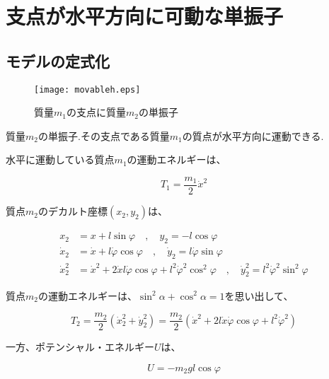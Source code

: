 \chapter{支点が水平方向に可動な単振子}

\section{モデルの定式化}

\begin{figure}[htbp]
  \begin{minipage}[b]{0.45\linewidth}
    \centering
    \texttt{[image: movableh.eps]}
    \caption{質量$m_1$の支点に質量$m_2$の単振子}
  \end{minipage}
\end{figure}

質量$m_2$の単振子.その支点である質量$m_1$の質点が水平方向に運動できる.

水平に運動している質点$m_1$の運動エネルギーは、

\[T_1 = \displaystyle\frac{m_1}{2}\dot{x}^2\]

質点$m_2$のデカルト座標$(x_2,y_2)$は、

\begin{align*}
   x_2 &= x + l\sin\varphi \quad,\quad y_2 = -l\cos\varphi\\
   \dot{x}_2 &= \dot{x} + l\dot{\varphi}\cos\varphi \quad,\quad \dot{y}_2 = l\dot{\varphi}\sin\varphi\\
   \dot{x}_2^2 &= \dot{x}^2 + 2\dot{x}l\dot{\varphi}\cos\varphi + l^2\dot{\varphi}^2\cos^2\varphi \quad,\quad \dot{y}_2^2 = l^2\dot{\varphi}^2\sin^2\varphi
\end{align*}

質点$m_2$の運動エネルギーは、$\sin^2\alpha+\cos^2\alpha=1$を思い出して、

\[T_2 = \displaystyle\frac{m_2}{2}\left(\dot{x}_2^2+\dot{y}_2^2\right) = \displaystyle\frac{m_2}{2}\left(\dot{x}^2 + 2l\dot{x}\dot{\varphi}\cos\varphi+l^2\dot{\varphi}^2\right)\]

一方、ポテンシャル・エネルギー$U$は、

\[U = -m_2gl\cos\varphi\]

